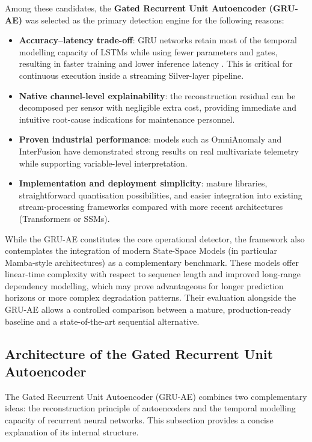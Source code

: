 Among these candidates, the \textbf{Gated Recurrent Unit Autoencoder (GRU-AE)} was selected as the primary detection engine for the following reasons:

\begin{itemize}
    \item \textbf{Accuracy–latency trade-off}: GRU networks retain most of the temporal modelling capacity of LSTMs while using fewer parameters and gates, resulting in faster training and lower inference latency \cite{dey2017gate}.
    This is critical for continuous execution inside a streaming Silver-layer pipeline.
    
    \item \textbf{Native channel-level explainability}: the reconstruction residual can be decomposed per sensor with negligible extra cost, providing immediate and intuitive root-cause indications for maintenance personnel.
    
    \item \textbf{Proven industrial performance}: models such as OmniAnomaly and InterFusion have demonstrated strong results on real multivariate telemetry while supporting variable-level interpretation.
    
    \item \textbf{Implementation and deployment simplicity}: mature libraries, straightforward quantisation possibilities, and easier integration into existing stream-processing frameworks compared with more recent architectures (Transformers or SSMs).
\end{itemize}

While the GRU-AE constitutes the core operational detector, the framework also contemplates the integration of modern State-Space Models (in particular Mamba-style architectures) as a complementary benchmark.
These models offer linear-time complexity with respect to sequence length and improved long-range dependency modelling, which may prove advantageous for longer prediction horizons or more complex degradation patterns.
Their evaluation alongside the GRU-AE allows a controlled comparison between a mature, production-ready baseline and a state-of-the-art sequential alternative.

\subsection{Architecture of the Gated Recurrent Unit Autoencoder}
\label{subsec:gru-ae-architecture}

The Gated Recurrent Unit Autoencoder (GRU-AE) combines two complementary ideas: the reconstruction principle of autoencoders and the temporal modelling capacity of recurrent neural networks.
This subsection provides a concise explanation of its internal structure.

